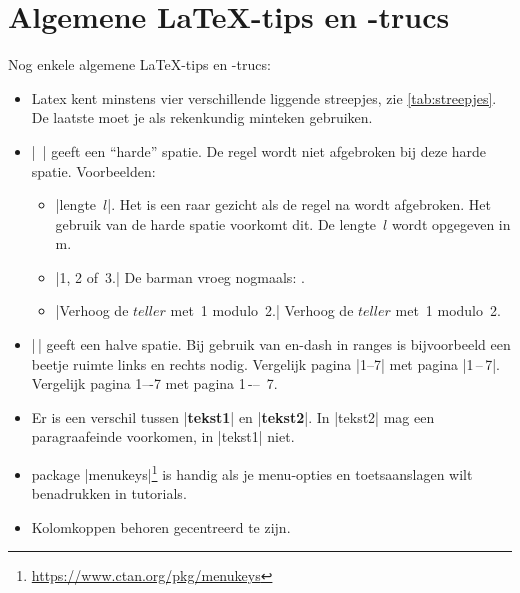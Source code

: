 \chapter{Algemene \LaTeX{}-tips en -trucs}
Nog enkele algemene \LaTeX{}-tips en -trucs:
\begin{itemize}
    \item Latex kent minstens vier verschillende liggende streepjes, zie \cref{tab:streepjes}.
        De laatste moet je als rekenkundig minteken gebruiken.
    \item |~| geeft een \enquote{harde} spatie.
    De regel wordt niet afgebroken bij deze harde spatie.
    Voorbeelden:
    \begin{itemize}
       	\item
       	|lengte~$l$|. Het is een raar gezicht als de regel na  wordt afgebroken. Het gebruik van de harde spatie voorkomt dit. 
       	De lengte~$l$ wordt opgegeven in \si{\meter}.
       	\item
       	|1, 2 of~3.| 
       	De barman vroeg nogmaals: .
       	\item 
       	|Verhoog de $teller$   met~1 modulo~2.|
       	Verhoog de $teller$ met~1 modulo~2.
    \end{itemize}
    \item |\,| geeft een halve spatie.
    Bij gebruik van en-dash in ranges is bijvoorbeeld een beetje ruimte links en
    rechts nodig. Vergelijk pagina |1--7| met pagina |1\,--\,7|. Vergelijk pagina
    1–-7 met pagina 1\,-–\, 7.
    \item Er is een verschil tussen |\textbf{tekst1}| en |{\bfseries tekst2}|. In |tekst2| mag een paragraafeinde voorkomen, in |tekst1| niet.
    \item package |menukeys|\footnote{\url{https://www.ctan.org/pkg/menukeys}} is handig als je menu-opties en toetsaanslagen wilt benadrukken in tutorials.
    \item Kolomkoppen behoren gecentreerd te zijn.

\end{itemize}
